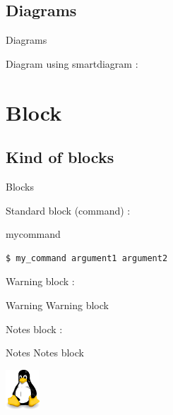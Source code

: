 \documentclass[aspectratio=43]{beamer}
\begin{document}

\subsection{Diagrams}
\begin{frame}{Diagrams}

Diagram using smartdiagram :

\vspace{-10pt}
\begin{center}
\end{center} 

\end{frame}


\section{Block}


\subsection{Kind of blocks}
\begin{frame}[fragile]{Blocks}

Standard block (command) :
\begin{block}{mycommand}
\begin{lstlisting}
$ my_command argument1 argument2
\end{lstlisting}
\end{block}

Warning block :
\begin{alertblock}{Warning}
Warning block
\end{alertblock}
 
Notes block :
\begin{exampleblock}{Notes}
Notes block
\end{exampleblock} 
 
\end{frame}


\begin{frame}[plain]

\begin{center}
\includegraphics[height=15mm]{images/my_logo.png}

\insertinstitute
\end{center}

\end{frame}

\end{document}
